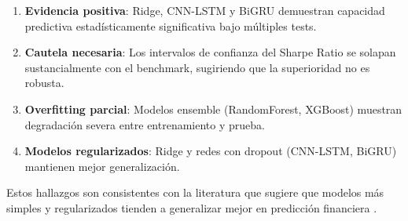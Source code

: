 \begin{enumerate}
    \item \textbf{Evidencia positiva}: Ridge, CNN-LSTM y BiGRU demuestran capacidad predictiva estad\'isticamente significativa bajo m\'ultiples tests.

    \item \textbf{Cautela necesaria}: Los intervalos de confianza del Sharpe Ratio se solapan sustancialmente con el benchmark, sugiriendo que la superioridad no es robusta.

    \item \textbf{Overfitting parcial}: Modelos ensemble (RandomForest, XGBoost) muestran degradaci\'on severa entre entrenamiento y prueba.

    \item \textbf{Modelos regularizados}: Ridge y redes con dropout (CNN-LSTM, BiGRU) mantienen mejor generalizaci\'on.
\end{enumerate}

Estos hallazgos son consistentes con la literatura que sugiere que modelos m\'as simples y regularizados tienden a generalizar mejor en predicci\'on financiera \citep{gu2020}.
